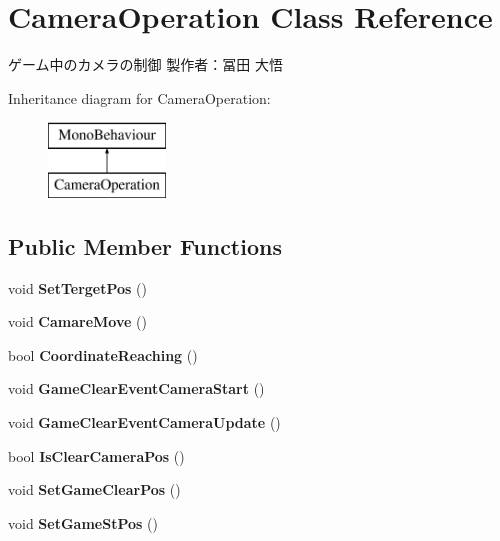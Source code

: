 \hypertarget{class_camera_operation}{}\section{Camera\+Operation Class Reference}
\label{class_camera_operation}


ゲーム中のカメラの制御 製作者：冨田 大悟  


Inheritance diagram for Camera\+Operation\+:\begin{figure}[H]
\begin{center}
\leavevmode
\includegraphics[height=2.000000cm]{class_camera_operation}
\end{center}
\end{figure}
\subsection*{Public Member Functions}
\begin{DoxyCompactItemize}
\item 
\mbox{\label{class_camera_operation_a1c6f347f95b3e689ffc17a232fff058f}} 
void {\bfseries Set\+Terget\+Pos} ()
\item 
\mbox{\label{class_camera_operation_a642d3e5d8c9dadd50c4a057b127f67b4}} 
void {\bfseries Camare\+Move} ()
\item 
\mbox{\label{class_camera_operation_a00acd642034ec8c5962ddf2fa5f3ca37}} 
bool {\bfseries Coordinate\+Reaching} ()
\item 
\mbox{\label{class_camera_operation_a3c89cd959ee02aee19cec170059e98f5}} 
void {\bfseries Game\+Clear\+Event\+Camera\+Start} ()
\item 
\mbox{\label{class_camera_operation_a82a59552f70fb9efaeb2f80d9972e38b}} 
void {\bfseries Game\+Clear\+Event\+Camera\+Update} ()
\item 
\mbox{\label{class_camera_operation_a838794eba75493ab0828d99cfc565c6f}} 
bool {\bfseries Is\+Clear\+Camera\+Pos} ()
\item 
\mbox{\label{class_camera_operation_aa1eb88f11e2d1edcb9f1be1fac73952a}} 
void {\bfseries Set\+Game\+Clear\+Pos} ()
\item 
\mbox{\label{class_camera_operation_a3c594708a2b43fb90a45344aab79d244}} 
void {\bfseries Set\+Game\+St\+Pos} ()
\end{DoxyCompactItemize}
